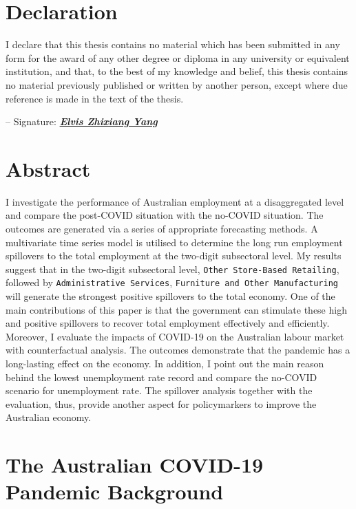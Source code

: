 \documentclass{monashthesis}
\begin{document}
\hypertarget{declaration}{%
\chapter*{Declaration}\label{declaration}}

I declare that this thesis contains no material which has been submitted in any form for the award of any other degree or diploma in any university or equivalent institution, and that, to the best of my knowledge and belief, this thesis contains no material previously published or written by another person, except where due reference is made in the text of the thesis.

\vspace{12pt}

-- Signature: \underline{\emph{\textbf{Elvis Zhixiang Yang}}}

\hypertarget{abstract}{%
\chapter*{Abstract}\label{abstract}}

I investigate the performance of Australian employment at a disaggregated level and compare the post-COVID situation with the no-COVID situation. The outcomes are generated via a series of appropriate forecasting methods. A multivariate time series model is utilised to determine the long run employment spillovers to the total employment at the two-digit subsectoral level. My results suggest that in the two-digit subsectoral level, \texttt{Other\ Store-Based\ Retailing}, followed by \texttt{Administrative\ Services}, \texttt{Furniture\ and\ Other\ Manufacturing} will generate the strongest positive spillovers to the total economy. One of the main contributions of this paper is that the government can stimulate these high and positive spillovers to recover total employment effectively and efficiently. Moreover, I evaluate the impacts of COVID-19 on the Australian labour market with counterfactual analysis. The outcomes demonstrate that the pandemic has a long-lasting effect on the economy. In addition, I point out the main reason behind the lowest unemployment rate record and compare the no-COVID scenario for unemployment rate. The spillover analysis together with the evaluation, thus, provide another aspect for policymarkers to improve the Australian economy.

\hypertarget{the-australian-covid-19-pandemic-background}{%
\chapter{The Australian COVID-19 Pandemic Background}\label{the-australian-covid-19-pandemic-background}}
\end{document}
